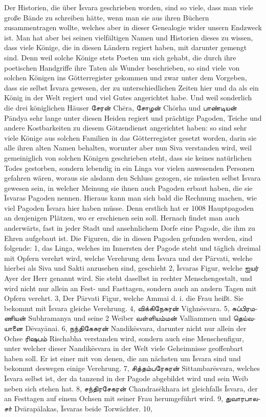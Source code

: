\documentclass{article}
\newcommand{\TamilText}[1]{\texttamil{#1}}
\newcommand{\tam}[1]{\TamilText{#1}}
\begin{document}
Der Historien, die über \={I}svara geschrieben worden, sind so viele, dass man viele große Bände zu schreiben hätte, wenn man sie aus ihren Büchern zusammentragen wollte, welches aber in dieser Genealogie wider unsern Endzweck ist. Man hat aber bei seinen vielfältigen Namen und Historien dieses zu wissen, dass viele Könige, die in diesen Ländern regiert haben, mit darunter gemengt sind. Denn weil solche Könige stets Poeten um sich gehabt, die durch ihre poetischen Handgriffe ihre Taten als Wunder beschrieben, so sind viele von solchen Königen ins Götterregister gekommen und zwar unter dem Vorgeben, dass sie selbst \={I}svara gewesen, der zu unterschiedlichen Zeiten hier und da als ein König in der Welt regiert und viel Gutes angerichtet habe. Und weil sonderlich die drei königlichen Häuser \tam{சேரன்} Ch\={e}ra, \tam{சோழன்} Ch\={o}rha und \tam{பாண்டியன்} P\={a}ndya sehr lange unter diesen Heiden regiert und prächtige Pagoden, Teiche und andere Kostbarkeiten zu diesem Götzendienst angerichtet haben: so sind sehr viele Könige aus solchen Familien in das Götterregister gesetzt worden, darin sie alle ihren alten Namen behalten, worunter aber nun Siva verstanden wird, weil gemeiniglich von solchen Königen geschrieben steht, dass sie keines natürlichen Todes gestorben, sondern lebendig in ein Linga vor vielen anwesenden Personen gefahren wären, woraus sie alsdann den Schluss gezogen, sie müssten selbst \={I}svara gewesen sein, in welcher Meinung sie ihnen auch Pagoden erbaut haben, die sie \={I}svaras Pagoden nennen. Hieraus kann man sich bald die Rechnung machen, wie viel Pagoden \={I}svara hier haben müsse. Denn erstlich hat er 1008 Hauptpagoden an denjenigen Plätzen, wo er erschienen sein soll. Hernach findet man auch anderwärts, fast in jeder Stadt und ansehnlichem Dorfe eine Pagode, die ihm zu Ehren aufgebaut ist. Die Figuren, die in diesen Pagoden gefunden werden, sind folgende: 1, das Linga, welches im Innersten der Pagode steht und täglich dreimal mit Opfern verehrt wird, welche Verehrung dem \={I}svara und der P\={a}rvati, welche hierbei als Siva und Sakti anzusehen sind, geschieht 2, \={I}svaras Figur, welche \tam{ஐயர்} Ayer der Herr genannt wird. Sie steht daselbst in rechter Menschengestalt, und wird nicht nur allein an Fest- und Fasttagen, sondern auch an andern Tagen mit Opfern verehrt. 3, Der P\={a}rvati Figur, welche Ammai d. i. die Frau heißt. Sie bekommt mit \={I}svara gleiche Verehrung. 4, \tam{விக்கிநேசுரன்} Vighn\={e}svara. 5, \tam{சுப்பிரமணியன்} Subhramanya und seine 2 Weiber \tam{வள்ளியம்மன்} Valliammen und \tam{தெய்வயானை} D\={e}vay\={a}nai. 6, \tam{நந்திகேசுரன்} Nandik\={e}svara, darunter nicht nur allein der Ochse \tam{ரிஷபம்} Rischabha verstanden wird, sondern auch eine Menschenfigur, unter welcher dieser Nandik\={e}svara in der Welt viele Geheimnisse geoffenbart haben soll. Er ist einer mit von denen, die am nächsten um \={I}svara sind und bekommt deswegen einige Verehrung. 7, \tam{சித்தம்பரேசுரன்} Sittambar\={e}svara, welches \={I}svara selbst ist, der da tanzend in der Pagode abgebildet wird und sein Weib neben sich stehen hat. 8, \tam{சந்திரசேகரன்} Chandras\={e}khara ist gleichfalls \={I}svara, der an Festtagen auf einem Ochsen mit seiner Frau herumgeführt wird. 9, \tam{துவாரபாலசா்} Dv\={a}rap\={a}lakas, \={I}svaras beide Torwächter. 10, 
\end{document}
